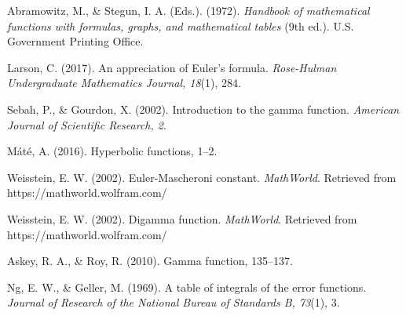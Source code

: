 \documentclass[a4paper,twoside,10pt]{article}
\begin{document}
\begin{thebibliography}{99}
 Abramowitz, M., \& Stegun, I. A. (Eds.). (1972). \textit{Handbook of mathematical functions with formulas, graphs, and mathematical tables} (9th ed.). U.S. Government Printing Office.

 Larson, C. (2017). An appreciation of Euler's formula. \textit{Rose-Hulman Undergraduate Mathematics Journal, 18}(1), 284.

 Sebah, P., \& Gourdon, X. (2002). Introduction to the gamma function. \textit{American Journal of Scientific Research, 2}.

 Máté, A. (2016). Hyperbolic functions, 1–2.

 Weisstein, E. W. (2002). Euler-Mascheroni constant. \textit{MathWorld}. Retrieved from https://mathworld.wolfram.com/

 Weisstein, E. W. (2002). Digamma function. \textit{MathWorld}. Retrieved from https://mathworld.wolfram.com/

 Askey, R. A., \& Roy, R. (2010). Gamma function, 135–137.

 Ng, E. W., \& Geller, M. (1969). A table of integrals of the error functions. \textit{Journal of Research of the National Bureau of Standards B, 73}(1), 3.





 








\end{thebibliography}
\end{document}
